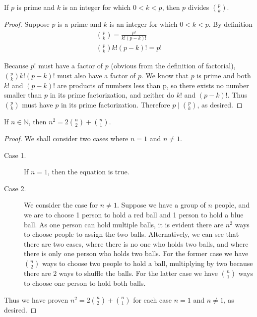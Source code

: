 \documentclass{exam}
\begin{document}
\begin{proposition}{4.21}
    If $p$ is prime and $k$ is an integer for which $0 < k < p$, then $p$ divides $\binom p k$.
\end{proposition}

\begin{proof}
    Suppose $p$ is a prime and $k$ is an integer for which $0 < k < p$. By definition
    \begin{align*}
        \binom{p}{k} =\frac{p!}{k!(p-k)!} \\
        \binom{p}{k} k!(p-k)! = p!
    \end{align*}

    Because $p!$ must have a factor of $p$ (obvious from the definition of factorial), $\binom{p}{k} k!(p-k)!$ must also have a factor of $p$. We know that $p$ is prime and both $k!$ and $(p-k)!$ are products of numbers less than p, so there exists no number smaller than $p$ in its prime factorization, and neither do $k!$ and $(p-k)!$. Thus $\binom{p}{k}$ must have $p$ in its prime factorization. Therefore $p \mid \binom p k$, as desired.

\end{proof}

\begin{proposition}{4.22}
    If $n\in\mathbb N$, then $n^2 = 2\binom n 2 + \binom n 1$.
\end{proposition}

\begin{proof}
    We shall consider two cases where $n=1$ and $n\neq 1$.
    \begin{description}
        \item[Case 1. ] If $n=1$, then the equation is true.
        \item[Case 2. ] We consider the case for $n\neq 1$. Suppose we have a group of $n$ people, and we are to choose 1 person to hold a red ball and 1 person to hold a blue ball. As one person can hold multiple balls, it is evident there are $n^2$ ways to choose people to assign the two balls. Alternatively, we can see that there are two cases, where there is no one who holds two balls, and where there is only one person who holds two balls. For the former case we have $\binom n 2$ ways to choose two people to hold a ball, multiplying by two because there are $2$ ways to shuffle the balls. For the latter case we have $\binom n 1$ ways to choose one person to hold both balls.
    \end{description}

    Thus we have proven $n^2=2\binom n 2 + \binom n 1$ for each case $n = 1$ and $n\neq 1$, as desired.
\end{proof}
\end{document}

